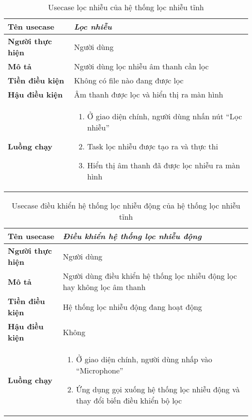 			\begin{table}[h]
				\centering
				\renewcommand{\tablename}{Usecase}
				\begin{tabular}{p{35mm} p{90mm}}
					\hline
					\textbf{Tên usecase}		& \textit{Lọc nhiễu} \\
					\hline
					\textbf{Người thực hiện}	& Người dùng \\
					\textbf{Mô tả}				& Người dùng lọc nhiễu âm thanh cần lọc \\
					\textbf{Tiền điều kiện} 	& Không có file nào đang được lọc \\
					\textbf{Hậu điều kiện}		& Âm thanh được lọc và hiển thị ra màn hình \\
					\textbf{Luồng chạy}			& 	\begin{enumerate}[1.]
														\item Ở giao diện chính, người dùng nhấn nút ``Lọc nhiễu''
														\item Task lọc nhiễu được tạo ra và thực thi
														\item Hiển thị âm thanh đã được lọc nhiễu ra màn hình
													\end{enumerate}	\\
					\hline
				\end{tabular}
			\caption{Usecase lọc nhiễu của hệ thống lọc nhiễu tĩnh}
			\label{design::static_usecase_3}
			\end{table}
		
			\begin{table}[h]
				\centering
				\renewcommand{\tablename}{Usecase}
				\begin{tabular}{p{35mm} p{90mm}}
					\hline
					\textbf{Tên usecase}		& \textit{Điều khiển hệ thống lọc nhiễu động} \\
					\hline
					\textbf{Người thực hiện}	& Người dùng \\
					\textbf{Mô tả}				& Người dùng điều khiển hệ thống lọc nhiễu động lọc hay không lọc âm thanh \\
					\textbf{Tiền điều kiện} 	& Hệ thống lọc nhiễu động đang hoạt động \\
					\textbf{Hậu điều kiện}		& Không \\
					\textbf{Luồng chạy}			& 	\begin{enumerate}[1.]
														\item Ở giao diện chính, người dùng nhấp vào ``Microphone''
														\item Ứng dụng gọi xuống hệ thống lọc nhiễu động và thay đổi biến điều khiển bộ lọc
													\end{enumerate}	\\
					\hline
				\end{tabular}
			\caption{Usecase điều khiển hệ thống lọc nhiễu động của hệ thống lọc nhiễu tĩnh}
			\label{design::static_usecase_4}
			\end{table}
		
